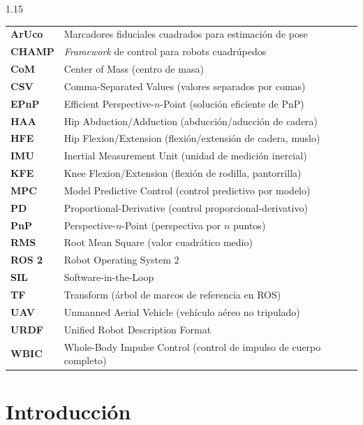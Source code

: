 \documentclass[12pt,a4paper]{report}
\begin{document}
\begin{spacing}{1.15}
\noindent
\begin{longtable}{@{} p{2.5cm} p{11.9cm} @{}}
    \textbf{ArUco} & Marcadores fiduciales cuadrados para estimación de pose \\
    \textbf{CHAMP} & \textit{Framework} de control para robots cuadrúpedos \\
    \textbf{CoM}   & Center of Mass (centro de masa) \\
    \textbf{CSV}   & Comma-Separated Values (valores separados por comas) \\
    \textbf{EPnP}  & Efficient Perspective-\(n\)-Point (solución eficiente de PnP) \\
    \textbf{HAA}   & Hip Abduction/Adduction (abducción/aducción de cadera) \\
    \textbf{HFE}   & Hip Flexion/Extension (flexión/extensión de cadera, muslo) \\
    \textbf{IMU}   & Inertial Measurement Unit (unidad de medición inercial) \\
    \textbf{KFE}   & Knee Flexion/Extension (flexión de rodilla, pantorrilla) \\
    \textbf{MPC}   & Model Predictive Control (control predictivo por modelo) \\
    \textbf{PD}    & Proportional-Derivative (control proporcional-derivativo) \\
    \textbf{PnP}   & Perspective-\(n\)-Point (perspectiva por \(n\) puntos) \\
    \textbf{RMS}   & Root Mean Square (valor cuadrático medio) \\
    \textbf{ROS 2} & Robot Operating System 2 \\
    \textbf{SIL}   & Software-in-the-Loop \\
    \textbf{TF}    & Transform (árbol de marcos de referencia en ROS) \\
    \textbf{UAV}   & Unmanned Aerial Vehicle (vehículo aéreo no tripulado) \\
    \textbf{URDF}  & Unified Robot Description Format \\
    \textbf{WBIC}  & Whole-Body Impulse Control (control de impulso de cuerpo completo) \\
\end{longtable}
\end{spacing}

\newpage
{}

\chapter{Introducción} \label{intro}
\end{document}
